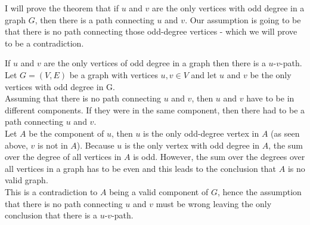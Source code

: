 \documentclass[a4paper]{article}
\begin{document}
	\newpage
	\begin{solution}{4}
		I will prove the theorem that if $u$ and $v$ are the only vertices with odd degree in a graph $G$, then there is a path connecting $u$ and $v$. Our assumption is going to be that there is no path connecting those odd-degree vertices - which we will prove to be a contradiction.
		\begin{theorem}{If $u$ and $v$ are the only vertices of odd degree in a graph then there is a $u$-$v$-path.}
		Let $G = (V, E)$ be a graph with vertices $u,v \in V$ and let $u$ and $v$ be the only vertices with odd degree in G. \\
		Assuming that there is no path connecting $u$ and $v$, then $u$ and $v$ have to be in different components. If they were in the same component, then there had to be a path connecting $u$ and $v$.\\
		Let $A$ be the component of $u$, then $u$ is the only odd-degree vertex in $A$ (as seen above, $v$ is not in $A$). Because $u$ is the only vertex with odd degree in $A$, the sum over the degree of all vertices in $A$ is odd. However, the sum over the degrees over all vertices in a graph has to be even and this leads to the conclusion that $A$ is no valid graph.\\
		This is a contradiction to $A$ being a valid component of $G$, hence the assumption that there is no path connecting $u$ and $v$ must be wrong leaving the only conclusion that there is a $u$-$v$-path.	
		\end{theorem}
	\end{solution}
\end{document}
